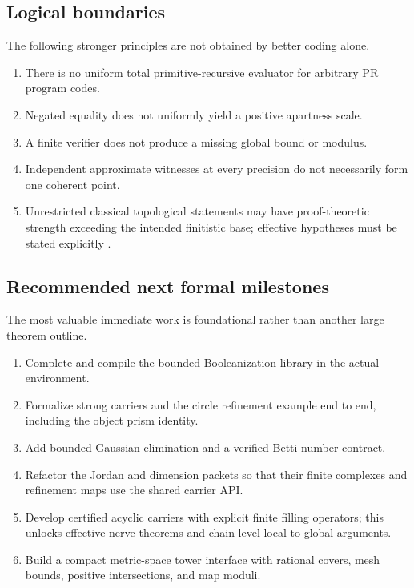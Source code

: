 \subsection{Logical boundaries}

The following stronger principles are not obtained by better coding alone.

\begin{enumerate}
  \item There is no uniform total primitive-recursive evaluator for arbitrary PR program codes.
  \item Negated equality does not uniformly yield a positive apartness scale.
  \item A finite verifier does not produce a missing global bound or modulus.
  \item Independent approximate witnesses at every precision do not necessarily form one coherent point.
  \item Unrestricted classical topological statements may have proof-theoretic strength exceeding the intended finitistic base; effective hypotheses must be stated explicitly \cite{Kihara2020}.
\end{enumerate}

\subsection{Recommended next formal milestones}

The most valuable immediate work is foundational rather than another large theorem outline.

\begin{enumerate}
  \item Complete and compile the bounded Booleanization library in the actual  environment.
  \item Formalize strong carriers and the circle refinement example end to end, including the object prism identity.
  \item Add bounded Gaussian elimination and a verified Betti-number contract.
  \item Refactor the Jordan and dimension packets so that their finite complexes and refinement maps use the shared carrier API.
  \item Develop certified acyclic carriers with explicit finite filling operators; this unlocks effective nerve theorems and chain-level local-to-global arguments.
  \item Build a compact metric-space tower interface with rational covers, mesh bounds, positive intersections, and map moduli.
\end{enumerate}

